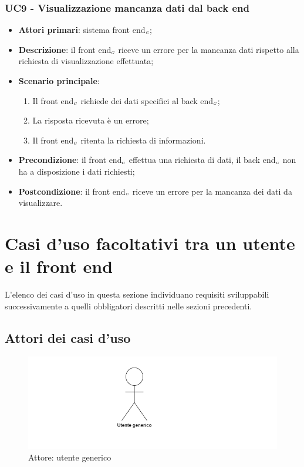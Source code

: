 \subsubsection{UC9 - Visualizzazione mancanza dati dal back end}\label{CasiDUsoCasiDUsoTraIlFrontEndEIlBackEndElencoDeiCasiDUsoUC9VisualizzazioneMessaggioDiMancanzaDatiDalBackEnd}
\begin{itemize}
	\item \textbf{Attori primari}: sistema front end$_{\scaleto{G}{3pt}}$;
	\item \textbf{Descrizione}: il front end$_{\scaleto{G}{3pt}}$ riceve un errore per la mancanza dati rispetto alla richiesta di visualizzazione effettuata;
	\item \textbf{Scenario principale}:
	\begin{enumerate}
		\item Il front end$_{\scaleto{G}{3pt}}$ richiede dei dati specifici al back end$_{\scaleto{G}{3pt}}$;
		\item La risposta ricevuta è un errore;
		\item Il front end$_{\scaleto{G}{3pt}}$ ritenta la richiesta di informazioni.
	\end{enumerate}
	\item \textbf{Precondizione}: il front end$_{\scaleto{G}{3pt}}$ effettua una richiesta di dati, il back end$_{\scaleto{G}{3pt}}$ non ha a disposizione i dati richiesti;
	\item \textbf{Postcondizione}: il front end$_{\scaleto{G}{3pt}}$ riceve un errore per la mancanza dei dati da visualizzare.
\end{itemize}

\newpage
\section{Casi d'uso facoltativi tra un utente e il front end}\label{CasiDUsoCasiDUsoFacoltativiTraUnUtenteEIlFrontEnd}
L'elenco dei casi d'uso in questa sezione individuano requisiti sviluppabili successivamente a quelli obbligatori descritti nelle sezioni precedenti.
\subsection{Attori dei casi d'uso}
\begin{center}
	\begin{figure}[H]
		\centering\includegraphics{../immagini/attori_casi/utente_generico.png}
		\caption{Attore: utente generico}
	\end{figure}
\end{center}
